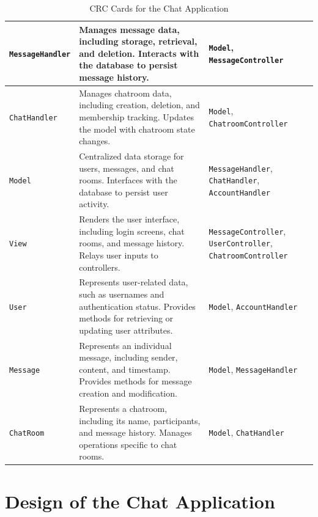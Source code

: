 \documentclass[12pt,a4paper]{report}
\begin{document}
\begin{table}[H]
{\begin{tabular}{|p{4cm}|p{8cm}|p{4.5cm}|}
      \hline
      \texttt{MessageHandler}     & Manages message data, including storage, retrieval, and deletion. Interacts with the database to persist message history.                            & \texttt{Model}, \texttt{MessageController}                                       \\
      \hline
      \texttt{ChatHandler}        & Manages chatroom data, including creation, deletion, and membership tracking. Updates the model with chatroom state changes.                         & \texttt{Model}, \texttt{ChatroomController}                                      \\
      \hline
      \texttt{Model}              & Centralized data storage for users, messages, and chat rooms. Interfaces with the database to persist user activity.                                 & \texttt{MessageHandler}, \texttt{ChatHandler}, \texttt{AccountHandler}           \\
      \hline
      \texttt{View}               & Renders the user interface, including login screens, chat rooms, and message history. Relays user inputs to controllers.                             & \texttt{MessageController}, \texttt{UserController}, \texttt{ChatroomController} \\
      \hline
      \texttt{User}               & Represents user-related data, such as usernames and authentication status. Provides methods for retrieving or updating user attributes.              & \texttt{Model}, \texttt{AccountHandler}                                          \\
      \hline
      \texttt{Message}            & Represents an individual message, including sender, content, and timestamp. Provides methods for message creation and modification.                  & \texttt{Model}, \texttt{MessageHandler}                                          \\
      \hline
      \texttt{ChatRoom}           & Represents a chatroom, including its name, participants, and message history. Manages operations specific to chat rooms.                             & \texttt{Model}, \texttt{ChatHandler}                                             \\
      \hline
    \end{tabular}
  }
  \caption{CRC Cards for the Chat Application}
  \label{crc_cards}
\end{table}

\chapter{Design of the Chat Application}
\end{document}
